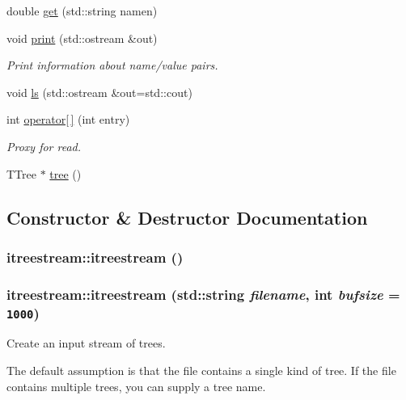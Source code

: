 \begin{CompactItemize}
double \hyperlink{classitreestream_a30}{get} (std::string namen)
\item 
void \hyperlink{classitreestream_a31}{print} (std::ostream \&out)
\begin{CompactList}\small\item\em Print information about name/value pairs. \item\end{CompactList}\item 
void \hyperlink{classitreestream_a32}{ls} (std::ostream \&out=std::cout)
\item 
int \hyperlink{classitreestream_a33}{operator\mbox{[}$\,$\mbox{]}} (int entry)
\begin{CompactList}\small\item\em Proxy for read. \item\end{CompactList}\item 
TTree $\ast$ \hyperlink{classitreestream_a34}{tree} ()
\end{CompactItemize}


\subsection{Constructor \& Destructor Documentation}
\hypertarget{classitreestream_a0}{
\subsubsection[itreestream]{\setlength{\rightskip}{0pt plus 5cm}itreestream::itreestream ()}}
\label{classitreestream_a0}


\hypertarget{classitreestream_a1}{
\subsubsection[itreestream]{\setlength{\rightskip}{0pt plus 5cm}itreestream::itreestream (std::string {\em filename}, int {\em bufsize} = {\tt 1000})}}
\label{classitreestream_a1}


Create an input stream of trees. 

The default assumption is that the file contains a single kind of tree. If the file contains multiple trees, you can supply a tree name. 

